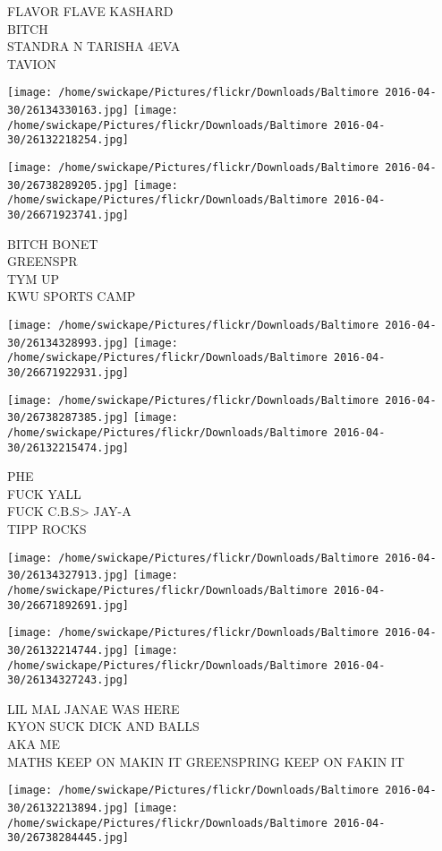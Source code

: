\documentclass[10pt,letterpaper]{article}
\begin{document}
FLAVOR FLAVE KASHARD\\
BITCH\\
STANDRA N TARISHA 4EVA\\
TAVION
\pagebreak

\texttt{[image: /home/swickape/Pictures/flickr/Downloads/Baltimore 2016-04-30/26134330163.jpg]}
\texttt{[image: /home/swickape/Pictures/flickr/Downloads/Baltimore 2016-04-30/26132218254.jpg]}

\texttt{[image: /home/swickape/Pictures/flickr/Downloads/Baltimore 2016-04-30/26738289205.jpg]}
\texttt{[image: /home/swickape/Pictures/flickr/Downloads/Baltimore 2016-04-30/26671923741.jpg]}

BITCH BONET\\
GREENSPR\\
TYM UP\\
KWU SPORTS CAMP
\pagebreak

\texttt{[image: /home/swickape/Pictures/flickr/Downloads/Baltimore 2016-04-30/26134328993.jpg]}
\texttt{[image: /home/swickape/Pictures/flickr/Downloads/Baltimore 2016-04-30/26671922931.jpg]}

\texttt{[image: /home/swickape/Pictures/flickr/Downloads/Baltimore 2016-04-30/26738287385.jpg]}
\texttt{[image: /home/swickape/Pictures/flickr/Downloads/Baltimore 2016-04-30/26132215474.jpg]}

PHE\\
FUCK YALL\\
FUCK C.B.S> JAY{-}A\\
TIPP ROCKS
\pagebreak

\texttt{[image: /home/swickape/Pictures/flickr/Downloads/Baltimore 2016-04-30/26134327913.jpg]}
\texttt{[image: /home/swickape/Pictures/flickr/Downloads/Baltimore 2016-04-30/26671892691.jpg]}

\texttt{[image: /home/swickape/Pictures/flickr/Downloads/Baltimore 2016-04-30/26132214744.jpg]}
\texttt{[image: /home/swickape/Pictures/flickr/Downloads/Baltimore 2016-04-30/26134327243.jpg]}

LIL MAL JANAE WAS HERE\\
KYON SUCK DICK AND BALLS\\
AKA ME\\
MATHS KEEP ON MAKIN IT GREENSPRING KEEP ON FAKIN IT
\pagebreak

\texttt{[image: /home/swickape/Pictures/flickr/Downloads/Baltimore 2016-04-30/26132213894.jpg]}
\texttt{[image: /home/swickape/Pictures/flickr/Downloads/Baltimore 2016-04-30/26738284445.jpg]}
\end{document}
